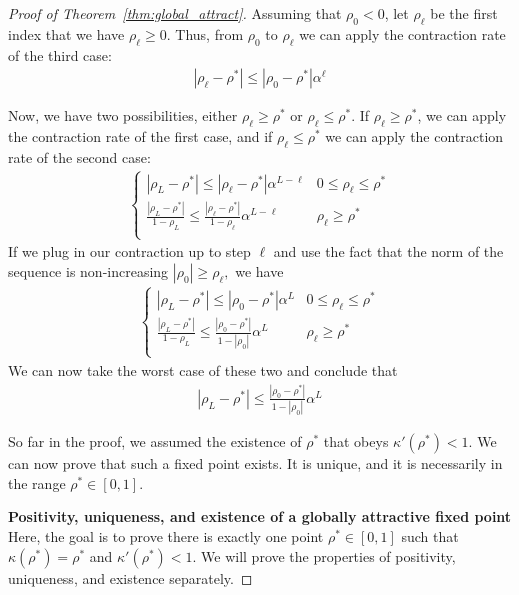 \documentclass[twoside]{article}
\theoremstyle{definition}
\begin{document}
\begin{proof}[Proof of Theorem~\ref{thm:global_attract}]
Assuming that $\rho_0 < 0$, let $\rho_\ell$ be the first index that we have $\rho_\ell \ge 0$. Thus, from $\rho_0$ to $\rho_\ell$ we can apply the contraction rate of the third case:
\begin{align*}
|\rho_\ell - \rho^*| \le |\rho_0 - \rho^*| \alpha^\ell
\end{align*}

Now, we have two possibilities, either $\rho_\ell \ge \rho^*$ or $\rho_\ell \le \rho^*$. If $\rho_\ell \ge \rho^*$, we can apply the contraction rate of the first case, and if $\rho_\ell \le \rho^*$ we can apply the contraction rate of the second case:
\begin{align*}
    \begin{cases}
|\rho_L - \rho^*| \le |\rho_\ell - \rho^*| \alpha^{L-\ell} & 0\le \rho_\ell\le \rho^*\\
\frac{|\rho_L-\rho^*|}{1-\rho_L} \le \frac{|\rho_\ell-\rho^*|}{1-\rho_\ell}\alpha^{L-\ell} & \rho_\ell\ge \rho^* \\
    \end{cases}
\end{align*}
If we plug in our contraction up to step $\ell$ and use the fact that the norm of the sequence is non-increasing $|\rho_0|\ge \rho_\ell,$ we have
\begin{align*}
    \begin{cases}
|\rho_L - \rho^*| \le |\rho_0 - \rho^*| \alpha^{L} & 0\le \rho_\ell\le \rho^*\\
\frac{|\rho_L-\rho^*|}{1-\rho_L} \le \frac{|\rho_0-\rho^*|}{1-|\rho_0|}\alpha^{L} & \rho_\ell\ge \rho^* \\
    \end{cases}
\end{align*}
We can now take the worst case of these two and conclude that
\begin{align*}
|\rho_L - \rho^*| \le \frac{|\rho_0 - \rho^*|}{1-|\rho_0|} \alpha^L
\end{align*}

So far in the proof, we assumed the existence of $\rho^*$ that obeys $\kappa'(\rho^*)<1.$ We can now prove that such a fixed point exists. It is unique, and it is necessarily in the range $\rho^*\in [0,1].$

\textbf{Positivity, uniqueness, and existence of a globally attractive fixed point}
Here, the goal is to prove there is exactly one point $\rho^*\in[0,1]$ such that $\kappa(\rho^*) = \rho^*$ and $\kappa'(\rho^*) < 1.$ We will prove the properties of positivity, uniqueness, and existence separately.


\end{proof}
\end{document}
